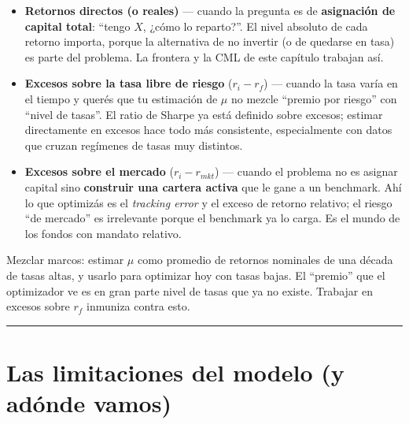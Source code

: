 \documentclass[
  spanish,
  letterpaper,
  DIV=11,
  numbers=noendperiod]{scrreprt}
\providecommand{\tightlist}{%
  \setlength{\itemsep}{0pt}\setlength{\parskip}{0pt}}
\begin{document}
\begin{itemize}
\tightlist
\item
  \textbf{Retornos directos (o reales)} --- cuando la pregunta es de
  \textbf{asignación de capital total}: ``tengo \(X\), ¿cómo lo
  reparto?''. El nivel absoluto de cada retorno importa, porque la
  alternativa de no invertir (o de quedarse en tasa) es parte del
  problema. La frontera y la CML de este capítulo trabajan así.
\item
  \textbf{Excesos sobre la tasa libre de riesgo} (\(r_i - r_f\)) ---
  cuando la tasa varía en el tiempo y querés que tu estimación de
  \(\mu\) no mezcle ``premio por riesgo'' con ``nivel de tasas''. El
  ratio de Sharpe ya está definido sobre excesos; estimar directamente
  en excesos hace todo más consistente, especialmente con datos que
  cruzan regímenes de tasas muy distintos.
\item
  \textbf{Excesos sobre el mercado} (\(r_i - r_{mkt}\)) --- cuando el
  problema no es asignar capital sino \textbf{construir una cartera
  activa} que le gane a un benchmark. Ahí lo que optimizás es el
  \emph{tracking error} y el exceso de retorno relativo; el riesgo ``de
  mercado'' es irrelevante porque el benchmark ya lo carga. Es el mundo
  de los fondos con mandato relativo.
\end{itemize}

\begin{tcolorbox}[enhanced jigsaw, bottomrule=.15mm, colback=white, opacitybacktitle=0.6, arc=.35mm, toprule=.15mm, opacityback=0, breakable, titlerule=0mm, left=2mm, coltitle=black, colbacktitle=quarto-callout-warning-color!10!white, colframe=quarto-callout-warning-color-frame, leftrule=.75mm, toptitle=1mm, bottomtitle=1mm, title=\textcolor{quarto-callout-warning-color}{\faExclamationTriangle}\hspace{0.5em}{El error clásico}, rightrule=.15mm]

Mezclar marcos: estimar \(\mu\) como promedio de retornos nominales de
una década de tasas altas, y usarlo para optimizar hoy con tasas bajas.
El ``premio'' que el optimizador ve es en gran parte nivel de tasas que
ya no existe. Trabajar en excesos sobre \(r_f\) inmuniza contra esto.

\end{tcolorbox}

\begin{center}\rule{0.5\linewidth}{0.5pt}\end{center}

\chapter{Las limitaciones del modelo (y adónde
vamos)}\label{las-limitaciones-del-modelo-y-aduxf3nde-vamos}
\end{document}
